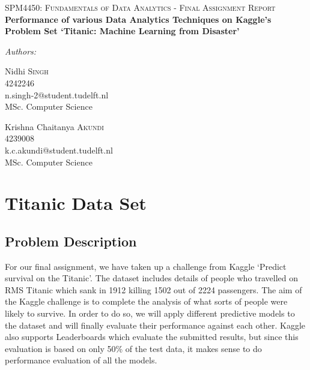 \documentclass[a4paper,10pt]{report}\usepackage[]{graphicx}\usepackage[]{color}
\date{\today}
\begin{document}
\begin{titlepage}
\begin{center}

\textsc{\Large SPM4450: Fundamentals of Data Analytics - Final Assignment Report }\\[6cm]

{ \bfseries \Large Performance of various Data Analytics Techniques on Kaggle's Problem Set `Titanic: Machine Learning from Disaster' \\[6cm] }

\begin{minipage}{0.6\textwidth}
\emph{Authors:}\\
\begin{flushleft} \large
Nidhi \textsc{Singh}\\
4242246 \\
n.singh-2@student.tudelft.nl\\
MSc. Computer Science\\
\end{flushleft}

\begin{flushright} \large
Krishna Chaitanya \textsc{Akundi}\\
4239008 \\
k.c.akundi@student.tudelft.nl\\
MSc. Computer Science\\
\end{flushright}

\end{minipage}

\end{center}
\end{titlepage}

\listoffigures

\chapter{Titanic Data Set}
\section{Problem Description}
For our final assignment, we have taken up a challenge from Kaggle `Predict survival on the Titanic'. The dataset includes details of people who travelled on RMS Titanic which sank in 1912 killing 1502 out of 2224 passengers.
The aim of the Kaggle challenge is to complete the analysis of what sorts of people were likely to survive. In order to do so, we will apply different predictive models to the dataset and will finally evaluate their performance against each other. Kaggle also supports Leaderboards which evaluate the submitted results, but since this evaluation is based on only 50\% of the test data, it makes sense to do performance evaluation of all the models.
\end{document}
